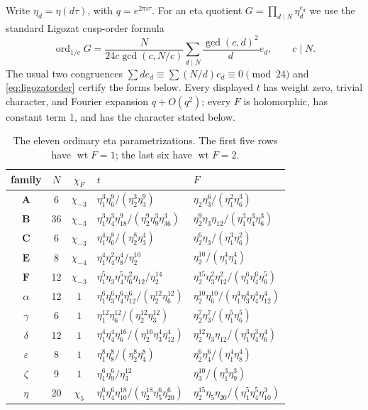 \documentclass[11pt]{article}
\theoremstyle{remark}
\newcommand{\chim}{\chi_{-3}}
\newcommand{\chifour}{\chi_{-4}}
\newcommand{\chifive}{\chi_{5}}
\begin{document}
Write $\eta_d=\eta(d\tau)$, with $q=e^{2\pi i\tau}$.  For an eta quotient
$G=\prod_{d\mid N}\eta_d^{e_d}$ we use the standard Ligozat cusp-order
formula
\begin{equation}
 \operatorname{ord}_{1/c}G=
 \frac{N}{24c\gcd(c,N/c)}
 \sum_{d\mid N}\frac{\gcd(c,d)^2}{d}e_d,
 \qquad c\mid N.
 \label{eq:ligozatorder}
\end{equation}
The usual two congruences
$\sum d e_d\equiv\sum (N/d)e_d\equiv0\pmod{24}$ and
\eqref{eq:ligozatorder} certify the forms below.  Every displayed $t$ has
weight zero, trivial character, and Fourier expansion $q+O(q^2)$; every $F$
is holomorphic, has constant term $1$, and has the character stated below.

\begin{table}[ht]
\centering
\small
\renewcommand{\arraystretch}{1.22}
\begin{tabular}{@{}c c c p{5.1cm} p{5.1cm}@{}}
\toprule
family & $N$ & $\chi_F$ & $t$ & $F$\\
\midrule
$\mathbf A$&6&$\chim$&
$\eta_1^3\eta_6^9/(\eta_2^3\eta_3^9)$&
$\eta_2\eta_3^6/(\eta_1^2\eta_6^3)$\\
$\mathbf B$&36&$\chim$&
$\eta_1^3\eta_4^3\eta_{18}^9/(\eta_2^9\eta_9^3\eta_{36}^3)$&
$\eta_2^9\eta_3\eta_{12}/(\eta_1^3\eta_4^3\eta_6^3)$\\
$\mathbf C$&6&$\chim$&
$\eta_1^4\eta_6^8/(\eta_2^8\eta_3^4)$&
$\eta_2^6\eta_3/(\eta_1^3\eta_6^2)$\\
$\mathbf E$&8&$\chifour$&
$\eta_1^4\eta_4^2\eta_8^4/\eta_2^{10}$&
$\eta_2^{10}/(\eta_1^4\eta_4^4)$\\
$\mathbf F$&12&$\chim$&
$\eta_1^5\eta_3\eta_4^5\eta_6^2\eta_{12}/\eta_2^{14}$&
$\eta_2^{15}\eta_3^2\eta_{12}^2/(\eta_1^6\eta_4^6\eta_6^5)$\\[2pt]
$\alpha$&12&$1$&
$\eta_1^6\eta_3^6\eta_4^6\eta_{12}^6/(\eta_2^{12}\eta_6^{12})$&
$\eta_2^{10}\eta_6^{10}/(\eta_1^4\eta_3^4\eta_4^4\eta_{12}^4)$\\
$\gamma$&6&$1$&
$\eta_1^{12}\eta_6^{12}/(\eta_2^{12}\eta_3^{12})$&
$\eta_2^7\eta_3^7/(\eta_1^5\eta_6^5)$\\
$\delta$&12&$1$&
$\eta_1^4\eta_4^4\eta_6^{16}/(\eta_2^{16}\eta_3^4\eta_{12}^4)$&
$\eta_2^{12}\eta_3\eta_{12}/(\eta_1^3\eta_4^3\eta_6^4)$\\
$\varepsilon$&8&$1$&
$\eta_1^8\eta_8^8/(\eta_2^8\eta_4^8)$&
$\eta_2^6\eta_4^6/(\eta_1^4\eta_8^4)$\\
$\zeta$&9&$1$&
$\eta_1^6\eta_9^6/\eta_3^{12}$&
$\eta_3^{10}/(\eta_1^3\eta_9^3)$\\
$\eta$&20&$\chifive$&
$\eta_1^6\eta_4^6\eta_{10}^{18}/(\eta_2^{18}\eta_5^6\eta_{20}^6)$&
$\eta_2^{15}\eta_5\eta_{20}/(\eta_1^5\eta_4^5\eta_{10}^3)$\\
\bottomrule
\end{tabular}
\caption{The eleven ordinary eta parametrizations.  The first five rows have
$\operatorname{wt}F=1$; the last six have $\operatorname{wt}F=2$.}
\label{tab:eta}
\end{table}
\end{document}
